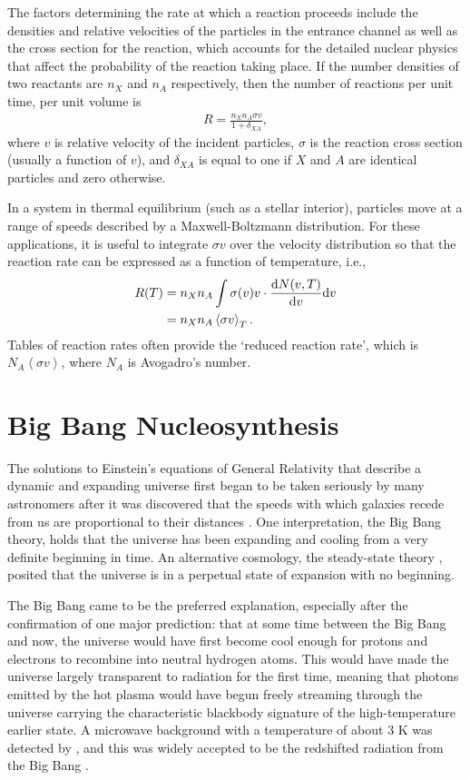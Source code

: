 The factors determining the rate at which a reaction proceeds include the densities and relative velocities of the particles in the entrance channel as well as the cross section for the reaction, which accounts for the detailed nuclear physics that affect the probability of the reaction taking place. If the number densities of two reactants are $n_X$ and $n_A$ respectively, then the number of reactions per unit time, per unit volume is
\begin{align*}
	R = \frac{n_X n_A \sigma v}{1 + \delta_{XA}},
\end{align*}
where $v$ is relative velocity of the incident particles, $\sigma$ is the reaction cross section (usually a function of $v$), and $\delta_{XA}$ is equal to one if $X$ and $A$ are identical particles and zero otherwise.

In a system in thermal equilibrium (such as a stellar interior), particles move at a range of speeds described by a Maxwell-Boltzmann distribution. For these applications, it is useful to integrate $\sigma v$ over the velocity distribution so that the reaction rate can be expressed as a function of temperature, i.e.,
\begin{align*}
	R(T) &= n_X n_A \int \sigma(v) v \cdot \frac{\mathrm{d} N(v,T)}{\mathrm{d} v} \mathrm{d} v\\
		 &= n_X n_A \left<\sigma v\right>_T.
\end{align*}
Tables of reaction rates often provide the `reduced reaction rate', which is $N_A\left<\sigma v\right>$, where $N_A$ is Avogadro's number.

\section{Big Bang Nucleosynthesis}
The solutions to Einstein's equations of General Relativity that describe a dynamic and expanding universe \citep{Friedmann:1922cp,Lemaitre:1927uy} first began to be taken seriously by many astronomers after it was discovered that the speeds with which galaxies recede from us are proportional to their distances \citep{Lemaitre:1927uy,Hubble:1929ic}. One interpretation, the Big Bang theory, holds that the universe has been expanding and cooling from a very definite beginning in time. An alternative cosmology, the steady-state theory \citep{Hoyle:1948ul}, posited that the universe is in a perpetual state of expansion with no beginning.

The Big Bang came to be the preferred explanation, especially after the confirmation of one major prediction: that at some time between the Big Bang and now, the universe would have first become cool enough for protons and electrons to recombine into neutral hydrogen atoms. This would have made the universe largely transparent to radiation for the first time, meaning that photons emitted by the hot plasma would have begun freely streaming through the universe carrying the characteristic blackbody signature of the high-temperature earlier state. A microwave background with a temperature of about 3 K was detected by \citet{Penzias:1965es}, and this was widely accepted to be the redshifted radiation from the Big Bang \citep{Dicke:1965hc}.


